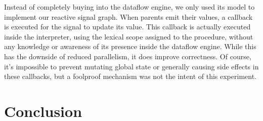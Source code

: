 Instead of completely buying into the dataflow engine, we only used its model to implement our reactive signal graph. When parents emit their values, a callback is executed for the signal to update its value. This callback is actually executed inside the interpreter, using the lexical scope assigned to the procedure, without any knowledge or awareness of its presence inside the dataflow engine.
While this has the downside of reduced parallelism, it does improve correctness. Of course, it's impossible to prevent mutating global state or generally causing side effects in these callbacks, but a foolproof mechanism was not the intent of this experiment. 

\section{Conclusion}





